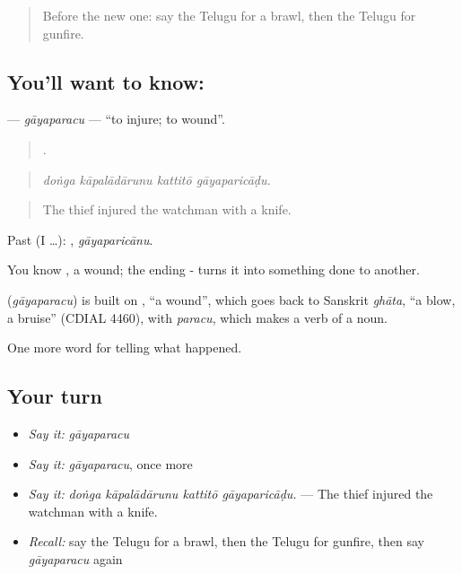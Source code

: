 \label{lesson:TE-C378-gayaparacu}



\begin{quote}
Before the new one: say the Telugu for a brawl, then the Telugu for gunfire.
\end{quote}

\subsection*{You'll want to know: }
\textbf{} — \emph{gāyaparacu} — \textquotedblleft{}to injure; to wound\textquotedblright{}.

\begin{quote}
   .
\end{quote}

\begin{quote}
\emph{doṅga kāpalādārunu kattitō gāyaparicāḍu.}
\end{quote}

\begin{quote}
The thief injured the watchman with a knife.
\end{quote}

Past (I …): , \emph{gāyaparicānu}.

You know , a wound; the ending - turns it into something done to another.

\begin{cousinweb}
\textbf{} (\emph{gāyaparacu}) is built on , \textquotedblleft{}a wound\textquotedblright{}, which goes back to Sanskrit \emph{ghāta}, \textquotedblleft{}a blow, a bruise\textquotedblright{} (CDIAL 4460), with \emph{paracu}, which makes a verb of a noun.
\end{cousinweb}

\begin{grammarlens}[title={What you've built}]
One more word for telling what happened.
\end{grammarlens}

\subsection*{Your turn}
\begin{itemize}
\raggedright
  \item \emph{Say it:} \emph{gāyaparacu}
  \item \emph{Say it:} \emph{gāyaparacu}, once more
  \item \emph{Say it:} \emph{doṅga kāpalādārunu kattitō gāyaparicāḍu.} — The thief injured the watchman with a knife.
  \item \emph{Recall:} say the Telugu for a brawl, then the Telugu for gunfire, then say \emph{gāyaparacu} again
\end{itemize}

